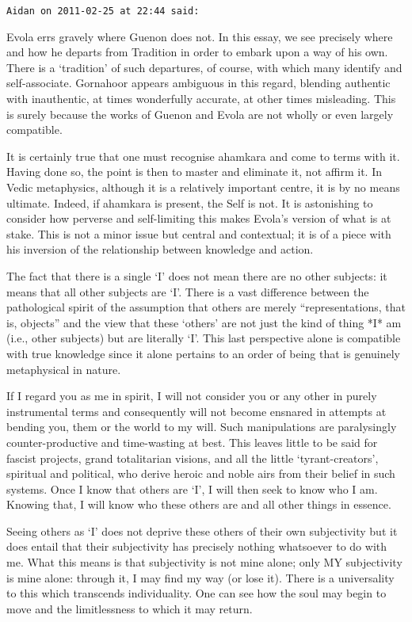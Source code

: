 \begin{footnotesize}
\begin{sffamily}
\texttt{Aidan on 2011-02-25 at 22:44 said:}

Evola errs gravely where Guenon does not. In this essay, we see precisely where and how he departs from Tradition in order to embark upon a way of his own. There is a `tradition' of such departures, of course, with which many identify and self-associate. Gornahoor appears ambiguous in this regard, blending authentic with inauthentic, at times wonderfully accurate, at other times misleading. This is surely because the works of Guenon and Evola are not wholly or even largely compatible.

It is certainly true that one must recognise ahamkara and come to terms with it. Having done so, the point is then to master and eliminate it, not affirm it. In Vedic metaphysics, although it is a relatively important centre, it is by no means ultimate. Indeed, if ahamkara is present, the Self is not. It is astonishing to consider how perverse and self-limiting this makes Evola's version of what is at stake. This is not a minor issue but central and contextual; it is of a piece with his inversion of the relationship between knowledge and action.

The fact that there is a single `I' does not mean there are no other subjects: it means that all other subjects are `I'. There is a vast difference between the pathological spirit of the assumption that others are merely ``representations, that is, objects'' and the view that these `others' are not just the kind of thing *I* am (i.e., other subjects) but are literally `I'. This last perspective alone is compatible with true knowledge since it alone pertains to an order of being that is genuinely metaphysical in nature.

If I regard you as me in spirit, I will not consider you or any other in purely instrumental terms and consequently will not become ensnared in attempts at bending you, them or the world to my will. Such manipulations are paralysingly counter-productive and time-wasting at best. This leaves little to be said for fascist projects, grand totalitarian visions, and all the little `tyrant-creators', spiritual and political, who derive heroic and noble airs from their belief in such systems. Once I know that others are `I', I will then seek to know who I am. Knowing that, I will know who these others are and all other things in essence.

Seeing others as `I' does not deprive these others of their own subjectivity but it does entail that their subjectivity has precisely nothing whatsoever to do with me. What this means is that subjectivity is not mine alone; only MY subjectivity is mine alone: through it, I may find my way (or lose it). There is a universality to this which transcends individuality. One can see how the soul may begin to move and the limitlessness to which it may return.


\end{sffamily}
\end{footnotesize}
